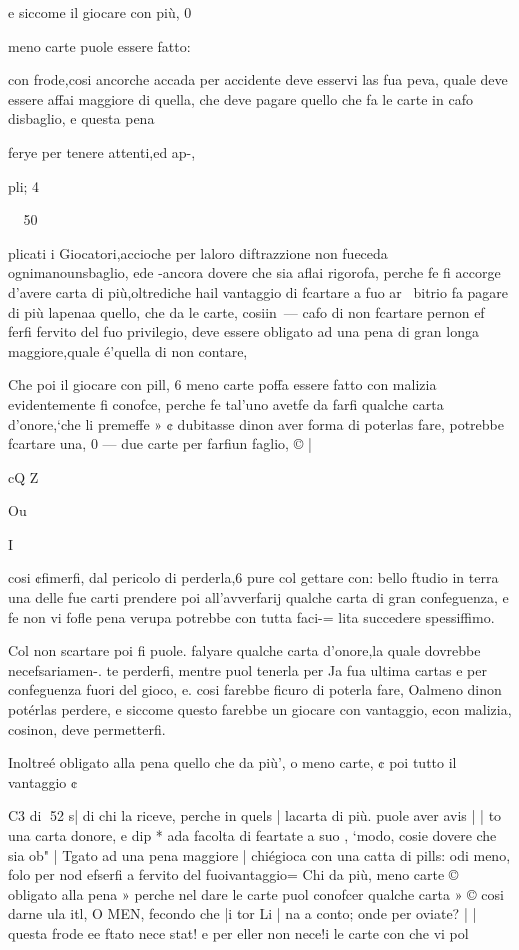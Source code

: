 \documentclass[12pt,a6paper]{article}
\begin{document}
e siccome il giocare con più, 0

meno carte puole essere fatto:

con frode,cosi ancorche accada
per accidente deve esservi las
fua peva, quale deve essere affai maggiore di quella, che deve pagare quello che fa le carte
in cafo disbaglio, e questa pena

ferye per tenere attenti,ed ap-,

pli; 4

~
50

plicati i Giocatori,accioche per
laloro diftrazzione non fueceda ognimanounsbaglio, ede
-ancora dovere che sia aflai rigorofa, perche fe fi accorge d’avere carta di più,oltrediche hail
vantaggio di fcartare a fuo ar~
bitrio fa pagare di più lapenaa
quello, che da le carte, cosiin~—
cafo di non fcartare pernon ef
ferfi fervito del fuo privilegio,
deve essere obligato ad una pena di gran longa maggiore,quale é’quella di non contare,

Che poi il giocare con pill, 6
meno carte poffa essere fatto
con malizia evidentemente fi
conofce, perche fe tal’uno avetfe da farfi qualche carta d’onore,‘che li premeffe » ¢ dubitasse
dinon aver forma di poterlas
fare, potrebbe fcartare una, 0 —
due carte per farfiun faglio, © |

cQ
Z
 

Ou

I

cosi ¢fimerfi, dal pericolo di
perderla,6 pure col gettare con:
bello ftudio in terra una delle
fue carti prendere poi all’avverfarij qualche carta di gran confeguenza, e fe non vi fofle pena
verupa potrebbe con tutta faci-=
lita succedere spessiffimo. 

Col non scartare poi fi puole.
falyare qualche carta d’onore,la
quale dovrebbe necefsariamen-.
te perderfi, mentre puol tenerla per Ja fua ultima cartas e per
confeguenza fuori del gioco, e.
cosi farebbe ficuro di poterla fare, Oalmeno dinon potérlas
perdere, e siccome questo farebbe un giocare con vantaggio, econ malizia, cosinon,
deve permetterfi.

Inoltreé obligato alla pena
quello che da più’, o meno carte, ¢ poi tutto il vantaggio ¢

C3 di
52
s| di chi la riceve, perche in quels
| lacarta di più. puole aver avis
| | to una carta donore, e dip *
ada facolta di feartate a suo
, ‘modo, cosie dovere che sia ob"
| Tgato ad una pena maggiore
| chiégioca con una catta di pills:
odi meno, folo per nod efserfi
a fervito del fuoivantaggio=
Chi da più, meno carte ©
obligato alla pena » perche nel
dare le carte puol conofcer
qualche carta » © cosi darne ula
itl, O MEN, fecondo che |i tor
Li | na a conto; onde per oviate?
| | questa frode ee ftato nece stat!
e per eller
non nece!i le carte con
che vi pol
\end{document}
